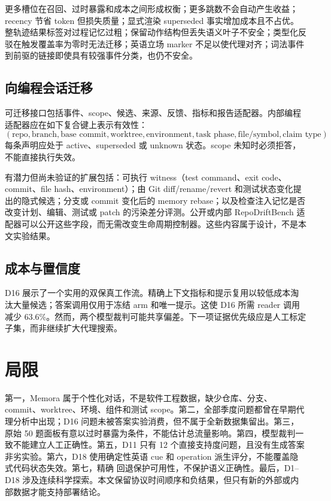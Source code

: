 更多槽位在召回、过时暴露和成本之间形成权衡；更多跳数不会自动产生收益；recency 节省 token 但损失质量；显式渲染 superseded 事实增加成本且不占优。整轨迹结果标签对过程记忆过粗；保留动作结构但丢失语义叶子不安全；类型化反驳在触发覆盖率为零时无法迁移；英语立场 marker 不足以使代理对齐；词法事件到前驱的链接即使具有较强事件分类，也仍不安全。

\subsection{向编程会话迁移}

可迁移接口包括事件、scope、候选、来源、反馈、指标和报告适配器。内部编程适配器应在如下复合键上表示有效性：
\[
(\text{repo},\text{branch},\text{base commit},\text{worktree},\text{environment},
\text{task phase},\text{file/symbol},\text{claim type}).
\]
每条声明应处于 active、superseded 或 unknown 状态。scope 未知时必须拒答，不能直接执行失效。

有潜力但尚未验证的扩展包括：可执行 witness（test command、exit code、commit、file hash、environment）；由 Git diff/rename/revert 和测试状态变化提出的隐式候选；分支或 commit 变化后的 memory rebase；以及检查注入记忆是否改变计划、编辑、测试或 patch 的污染差分评测。公开或内部 RepoDriftBench 适配器可以公开这些字段，而无需改变生命周期控制器。这些内容属于设计，不是本文实验结果。

\subsection{成本与置信度}

D16 展示了一个实用的双保真工作流。精确上下文指标和提示复用以较低成本淘汰大量候选；答案调用仅用于冻结 arm 和唯一提示。这使 D16 所需 reader 调用减少 63.6\%。然而，两个模型裁判可能共享偏差。下一项证据优先级应是人工标定子集，而非继续扩大代理搜索。

\section{局限}

第一，Memora 属于个性化对话，不是软件工程数据，缺少仓库、分支、commit、worktree、环境、组件和测试 scope。第二，全部季度问题都曾在早期代理分析中出现；D16 问题未被答案实验消费，但不属于全新数据集留出。第三，原始 50 题面板有意以过时暴露为条件，不能估计总流量影响。第四，模型裁判一致不能建立人工正确性。第五，D11 只有 12 个直接支持度问题，且没有生成答案非劣实验。第六，D18 使用确定性英语 cue 和 operation 派生评分，不能覆盖隐式代码状态失效。第七，精确 \base 回退保护可用性，不保护语义正确性。最后，D1--D18 涉及连续科学探索。本文保留协议时间顺序和负结果，但只有新的外部或内部数据才能支持部署结论。

